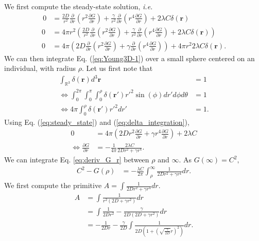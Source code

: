 \documentclass[english]{article}
\begin{document}
We first compute the steady-state solution,\textit{ i.e.}
\begin{align}
 \,0 & = \frac{2D}{r^{2}}\frac{\partial}{\partial r}\left(r^{2}\frac{\partial G}{\partial r}\right)+\frac{\gamma}{r^{2}}\frac{\partial}{\partial r}\left(r^{4}\frac{\partial G}{\partial r}\right)+2\lambda C\delta(\boldsymbol{r})\nonumber \\
0 & =  4\pi r^{2}\left(\frac{2D}{r^{2}}\frac{\partial}{\partial r}\left(r^{2}\frac{\partial G}{\partial r}\right)+\frac{\gamma}{r^{2}}\frac{\partial}{\partial r}\left(r^{4}\frac{\partial G}{\partial r}\right)+2\lambda C\delta(\boldsymbol{r})\right)\nonumber \\
0 & =  4\pi\left(2D\frac{\partial}{\partial r}\left(r^{2}\frac{\partial G}{\partial r}\right)+\gamma\frac{\partial}{\partial r}\left(r^{4}\frac{\partial G}{\partial r}\right)\right)+4\pi r^{2}2\lambda C\delta(\boldsymbol{r}).\label{eq:steady_state}
\end{align}
We can then integrate Eq. (\ref{eq:Young3D-1}) over a small sphere
centered on an individual, with radius $\rho$. Let us first note
that
\begin{align}
\int_{\mathbb{R}^{3}}\delta(\boldsymbol{r})d^{3}\boldsymbol{r} & = 1\nonumber \\
\Leftrightarrow\int_{0}^{2\pi}\int_{0}^{\pi}\int_{0}^{\rho}\delta(\boldsymbol{r}')r'^{2}\sin(\phi) dr'd\phi d\theta & = 1\nonumber \\
\Leftrightarrow4\pi\int_{0}^{\rho}\delta(\boldsymbol{r}')r'^{2}dr' & = 1.\label{eq:delta_integration}
\end{align}
Using Eq. (\ref{eq:steady_state}) and (\ref{eq:delta_integration}),
\begin{align}
 0 & = 4\pi\left(2Dr^{2}\frac{\partial G}{\partial r}+\gamma r^{4}\frac{\partial G}{\partial r}\right)+2\lambda C\nonumber \\
\Leftrightarrow \frac{\partial G}{\partial r} & = -\frac{1}{4\pi}\frac{2\lambda C}{2Dr^{2}+\gamma r^{4}}.\label{eq:deriv_G_r}
\end{align}
We can integrate Eq. \ref{eq:deriv_G_r} between $\rho$ and $\infty$.
As $G(\infty)=C^{2},$
\begin{align}
 C^{2}-G(\rho) & = -\frac{\lambda C}{2\pi}{\displaystyle \int_{\rho}^{\infty}}\frac{1}{2Dr^{2}+\gamma r^{4}}dr.\label{eq:deriv_G_r_int1}
\end{align}
We first compute the primitive $A=\int\frac{1}{2Dr^{2}+\gamma r^{4}}dr$.
\begin{align}
A & =  \int\frac{1}{r^{2}\left(2D+\gamma r^{2}\right)}dr\\
 & =  \int\frac{1}{2Dr^{2}}-\frac{\gamma}{2D\left(2D+\gamma r^{2}\right)}dr\\
 & =  -\frac{1}{2Dr}-\frac{\gamma}{2D}\int\frac{1}{2D\left(1+\left(\sqrt{\frac{\gamma}{2D}}r\right)^{2}\right)}dr.
\end{align}
\end{document}
